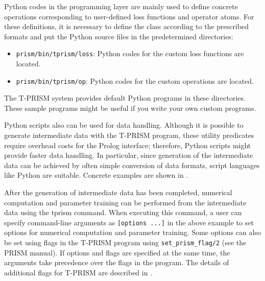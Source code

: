 \documentclass[a4paper]{report}
\begin{document}
Python codes in the programming layer are mainly used to define concrete operations corresponding to user-defined loss functions and operator atoms.
For these definitions, it is necessary to define the class according to the prescribed formats and put the Python source files in the predetermined directories:
\begin{itemize}
	\item {\tt prism/bin/tprism/loss}: Python codes for the custom loss functions are located.
	\item {\tt prism/bin/tprism/op}:  Python codes for the custom operations are located.
\end{itemize}
The T-PRISM system provides default Python programs in these directories.
These sample programs might be useful if you write your own custom programs.

Python scripts also can be used for data handling.
Although it is possible to generate intermediate data with the T-PRISM program,
these utility predicates require overhead costs for the Prolog interface; therefore, Python scripts might provide faster data handling.
In particular, since generation of the intermediate data can be achieved by often simple conversion of data formats, script languages like Python are suitable.
Concrete examples are shown in .


After the generation of intermediate data has been completed,
numerical computation and parameter training can be performed from the intermediate data using the tprism command.
When executing this command, a user can specify command-line arguments as \verb|[options ...]| in the above example to  set options for numerical computation and parameter training.
Some options can also be set using flags in the T-PRISM program using {\tt set\_prism\_flag/2} (see the PRISM manual).
If options and flags are specified at the same time, the arguments take precedence over the flags in the program.
The details of additional flags for T-PRISM are described in .
\end{document}
